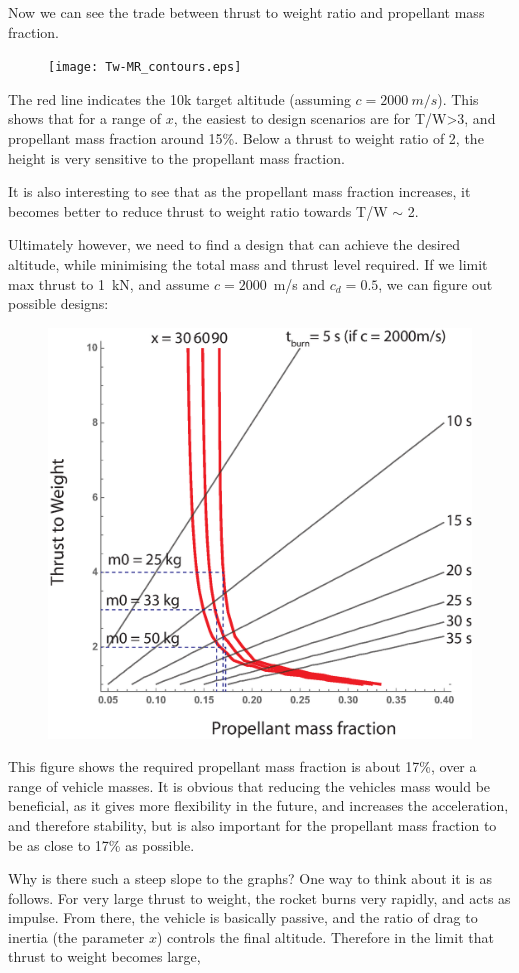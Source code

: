 \documentclass[12pt]{article}
\begin{document}
Now we can see the trade between thrust to weight ratio and propellant mass fraction. 

\begin{landscape}
\begin{figure}[htbp]
   \centering
   \texttt{[image: Tw-MR\_contours.eps]}
   \caption{}
   \label{fig:}
\end{figure}
\end{landscape}


The red line indicates the 10k target altitude (assuming $c = 2000~m/s$). This shows that for a range of $x$, the easiest to design scenarios are for T/W>3, and propellant mass fraction around 15\%. Below a thrust to weight ratio of 2, the height is very sensitive to the propellant mass fraction. 

It is also interesting to see that as the propellant mass fraction increases, it becomes better to reduce thrust to weight ratio towards T/W $\sim$ 2. 


Ultimately however, we need to find a design that can achieve the desired altitude, while minimising the total mass and thrust level required. If we limit max thrust to 1~kN, and assume $c=2000$~m/s and $c_d = 0.5$, we can figure out possible designs:

\begin{figure}[htbp]
   \centering
   \includegraphics[width=0.8\linewidth]{results.eps}
   \caption{}
   \label{fig:}
\end{figure}

This figure shows the required propellant mass fraction is about 17\%, over a range of vehicle masses. It is obvious that reducing the vehicles mass would be beneficial, as it gives more flexibility in the future, and increases the acceleration, and therefore stability, but is also important for the propellant mass fraction to be as close to 17\% as possible. 

Why is there such a steep slope to the graphs? One way to think about it is as follows. For very large thrust to weight, the rocket burns very rapidly, and acts as impulse. From there, the vehicle is basically passive, and the ratio of drag to inertia (the parameter $x$) controls the final altitude. Therefore in the limit that thrust to weight becomes large, 
\end{document}
